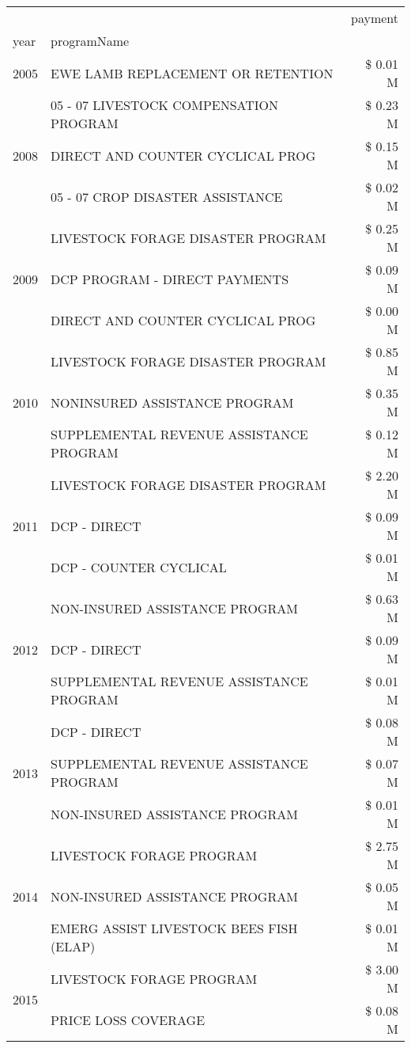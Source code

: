 \begin{tabular}{llr}
\toprule
 &  & payment \\
year & programName &  \\
\midrule
2005 & EWE LAMB REPLACEMENT OR RETENTION & \$ 0.01 M \\
\cline{1-3}
\multirow[t]{3}{*}{2008} & 05 - 07 LIVESTOCK COMPENSATION PROGRAM & \$ 0.23 M \\
 & DIRECT AND COUNTER CYCLICAL PROG & \$ 0.15 M \\
 & 05 - 07 CROP DISASTER ASSISTANCE & \$ 0.02 M \\
\cline{1-3}
\multirow[t]{3}{*}{2009} & LIVESTOCK FORAGE DISASTER  PROGRAM & \$ 0.25 M \\
 & DCP PROGRAM - DIRECT PAYMENTS & \$ 0.09 M \\
 & DIRECT AND COUNTER CYCLICAL PROG & \$ 0.00 M \\
\cline{1-3}
\multirow[t]{3}{*}{2010} & LIVESTOCK FORAGE DISASTER PROGRAM & \$ 0.85 M \\
 & NONINSURED ASSISTANCE PROGRAM & \$ 0.35 M \\
 & SUPPLEMENTAL REVENUE ASSISTANCE PROGRAM & \$ 0.12 M \\
\cline{1-3}
\multirow[t]{3}{*}{2011} & LIVESTOCK FORAGE DISASTER PROGRAM & \$ 2.20 M \\
 & DCP - DIRECT & \$ 0.09 M \\
 & DCP - COUNTER CYCLICAL & \$ 0.01 M \\
\cline{1-3}
\multirow[t]{3}{*}{2012} & NON-INSURED ASSISTANCE PROGRAM & \$ 0.63 M \\
 & DCP - DIRECT & \$ 0.09 M \\
 & SUPPLEMENTAL REVENUE ASSISTANCE PROGRAM & \$ 0.01 M \\
\cline{1-3}
\multirow[t]{3}{*}{2013} & DCP - DIRECT & \$ 0.08 M \\
 & SUPPLEMENTAL REVENUE ASSISTANCE PROGRAM & \$ 0.07 M \\
 & NON-INSURED ASSISTANCE PROGRAM & \$ 0.01 M \\
\cline{1-3}
\multirow[t]{3}{*}{2014} & LIVESTOCK FORAGE PROGRAM & \$ 2.75 M \\
 & NON-INSURED ASSISTANCE PROGRAM & \$ 0.05 M \\
 & EMERG ASSIST LIVESTOCK BEES FISH (ELAP) & \$ 0.01 M \\
\cline{1-3}
\multirow[t]{3}{*}{2015} & LIVESTOCK FORAGE PROGRAM & \$ 3.00 M \\
 & PRICE LOSS COVERAGE & \$ 0.08 M \\

\end{tabular}
